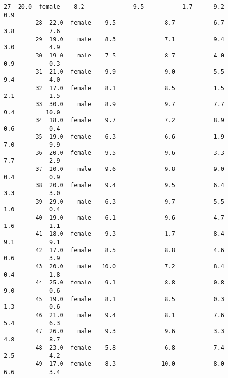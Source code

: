 \documentclass[11pt]{article}
\begin{document}
\begin{Verbatim}[commandchars=\\\{\}]
         27  20.0  female    8.2              9.5           1.7      9.2          0.9   
         28  22.0  female    9.5              8.7           6.7      3.8          7.6   
         29  19.0    male    8.3              7.1           9.4      3.0          4.9   
         30  19.0    male    7.5              8.7           4.0      0.9          0.3   
         31  21.0  female    9.9              9.0           5.5      9.4          4.0   
         32  17.0  female    8.1              8.5           1.5      2.1          1.5   
         33  30.0    male    8.9              9.7           7.7      9.4         10.0   
         34  18.0  female    9.7              7.2           8.9      0.6          0.4   
         35  19.0  female    6.3              6.6           1.9      7.0          9.9   
         36  20.0  female    9.5              9.6           3.3      7.7          2.9   
         37  20.0    male    9.6              9.8           9.0      0.4          0.9   
         38  20.0  female    9.4              9.5           6.4      3.3          3.0   
         39  29.0    male    6.3              9.7           5.5      1.0          0.4   
         40  19.0    male    6.1              9.6           4.7      1.6          1.1   
         41  18.0  female    9.3              1.7           8.4      9.1          9.1   
         42  17.0  female    8.5              8.8           4.6      0.6          3.9   
         43  20.0    male   10.0              7.2           8.4      0.4          1.8   
         44  25.0  female    9.1              8.8           0.8      9.0          0.6   
         45  19.0  female    8.1              8.5           0.3      1.3          0.6   
         46  21.0    male    9.4              8.1           7.6      5.4          6.3   
         47  26.0    male    9.3              9.6           3.3      4.8          8.7   
         48  23.0  female    5.8              6.8           7.4      2.5          4.2   
         49  17.0  female    8.3             10.0           8.0      6.6          3.4   
         

\end{Verbatim}
\end{document}
